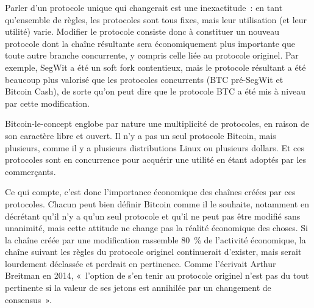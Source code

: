 Parler d'un protocole unique qui changerait est une inexactitude~: en tant qu'ensemble de règles, les protocoles sont tous fixes, mais leur utilisation (et leur utilité) varie. Modifier le protocole consiste donc à constituer un nouveau protocole dont la chaîne résultante sera économiquement plus importante que toute autre branche concurrente, y compris celle liée au protocole originel. Par exemple, SegWit a été un soft fork contentieux, mais le protocole résultant a été beaucoup plus valorisé que les protocoles concurrents (BTC pré-SegWit et Bitcoin Cash), de sorte qu'on peut dire que le protocole BTC a été mis à niveau par cette modification. %

Bitcoin-le-concept englobe par nature une multiplicité de protocoles, en raison de son caractère libre et ouvert. Il n'y a pas un seul protocole Bitcoin, mais plusieurs, comme il y a plusieurs distributions Linux ou plusieurs dollars. Et ces protocoles sont en concurrence pour acquérir une utilité en étant adoptés par les commerçants.

Ce qui compte, c'est donc l'importance économique des chaînes créées par ces protocoles. Chacun peut bien définir Bitcoin comme il le souhaite, notamment en décrétant qu'il n'y a qu'un seul protocole et qu'il ne peut pas être modifié sans unanimité, mais cette attitude ne change pas la réalité économique des choses. Si la chaîne créée par une modification rassemble 80~\% de l'activité économique, la chaîne suivant les règles du protocole originel continuerait d'exister, mais serait lourdement déclassée et perdrait en pertinence. Comme l'écrivait Arthur Breitman en 2014, «~l'option de s'en tenir au protocole originel n'est pas du tout pertinente si la valeur de ses jetons est annihilée par un changement de consensus~». %

